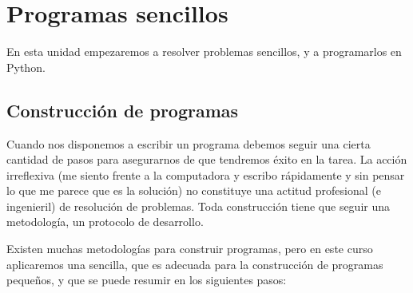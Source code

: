 \chapter[Programas sencillos]{Programas sencillos}

En esta unidad empezaremos a resolver problemas sencillos, y a
programarlos en Python.

\section{Construcción de programas}

Cuando nos disponemos a escribir un programa debemos seguir una cierta cantidad
de pasos para asegurarnos de que tendremos éxito en la tarea. La acción
irreflexiva (me siento frente a la computadora y escribo rápidamente y sin
pensar lo que me parece que es la solución) no constituye una actitud
profesional (e ingenieril) de resolución de problemas. Toda construcción tiene
que seguir una metodología, un protocolo de desarrollo.

Existen muchas metodologías para construir programas, pero en este
curso aplicaremos una sencilla, que es adecuada para
la construcción de programas pequeños, y que se puede resumir en
los siguientes pasos:

